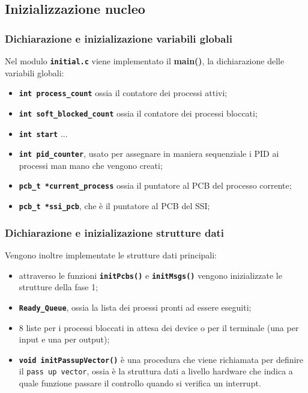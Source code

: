 \documentclass{article}
\begin{document}
\subsection{Inizializzazione nucleo}
\subsubsection{Dichiarazione e inizializazione variabili globali}
Nel modulo \texttt{\textbf{initial.c}} viene implementato il \textbf{main()}, la dichiarazione delle variabili globali:
\begin{itemize}
    \item \texttt{\textbf{int process\_count}} ossia il contatore dei processi attivi;
    \item \texttt{\textbf{int soft\_blocked\_count}} ossia il contatore dei processi bloccati;
    \item \texttt{\textbf{int start}} ...
    \item \texttt{\textbf{int pid\_counter}}, usato per assegnare in maniera sequenziale i PID ai processi man mano che vengono creati;
    \item \texttt{\textbf{pcb\_t *current\_process}} ossia il puntatore al PCB del processo corrente;
    \item \texttt{\textbf{pcb\_t *ssi\_pcb}}, che è il puntatore al PCB del SSI;
    
\end{itemize}

\subsubsection{Dichiarazione e inizializazione strutture dati}
Vengono inoltre implementate le strutture dati principali: 
\begin{itemize}
    \item attraverso le funzioni  \texttt{\textbf{initPcbs()}} e \texttt{\textbf{initMsgs()}} vengono inizializzate le strutture della fase 1;
    \item \texttt{\textbf{Ready\_Queue}}, ossia la lista dei proessi pronti ad essere eseguiti;
    \item 8 liste per i processi bloccati in attesa dei device o per il terminale (una per input e una per output);
    \item \texttt{\textbf{void initPassupVector()}} è una procedura che viene richiamata per definire il \texttt{pass up vector}, ossia è la struttura dati a livello hardware che indica a quale funzione passare il controllo quando si verifica un interrupt.
\end{itemize}
\end{document}
